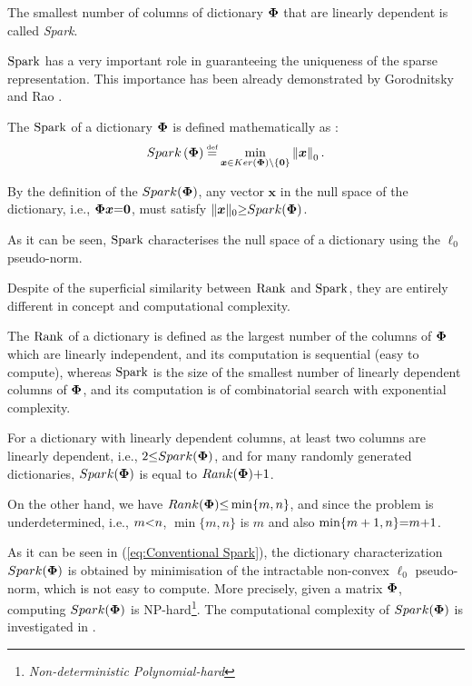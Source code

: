 The smallest number of columns of dictionary $\boldsymbol{\Phi}$ that are linearly dependent is called \emph{Spark}.

$\mathrm{Spark}$ has a very important role in guaranteeing the uniqueness of the sparse representation. 
This importance has been already demonstrated by Gorodnitsky and Rao \cite{Gorodnitsky1997}.

The $\mathrm{Spark}$ of a dictionary $\boldsymbol{\Phi}$ is defined mathematically as \cite{Gribonval2003a,Donoho2003,Donoho2003a,Bruckstein2009}:
\begin{equation}
\label{eq:Conventional Spark}
\mySpk\myparanthese{\myPhi} \myeq \min_{\boldsymbol{x} \in \myKerMath \backslash\left\{\boldsymbol{0}\right\}} \mynorm{\boldsymbol{x}}_{0}.
\end{equation}

By the definition of the $Spark(\boldsymbol{\Phi})$, any vector $\boldsymbol{x}$ in the null space of the dictionary, i.e., 
$\boldsymbol{\Phi} \boldsymbol{x}{=} \boldsymbol{0}$, must satisfy $\Vert\boldsymbol{x} \Vert_{0} {\geq} Spark(\boldsymbol{\Phi})$. 

As it can be seen, $\mathrm{Spark}$ characterises the null space of a dictionary using the $\ell_0$ pseudo-norm. 

Despite of the superficial similarity between $\mathrm{Rank}$ and $\mathrm{Spark}$, they are entirely different in concept and computational complexity. 

The $\mathrm{Rank}$ of a dictionary is defined as the largest number of the columns of $\boldsymbol{\Phi}$ which are linearly independent, and its computation is sequential (easy to compute), whereas $\mathrm{Spark}$ is the size of the smallest number of linearly dependent columns of $\boldsymbol{\Phi}$, and its computation is of combinatorial search with exponential complexity. 



For a dictionary with linearly dependent columns, at least two columns are linearly dependent, i.e., $2 {\leq} Spark(\boldsymbol{\Phi})$, and for many randomly generated dictionaries, $Spark(\boldsymbol{\Phi})$ is equal to $Rank(\boldsymbol{\Phi}) {+} 1$. 

On the other hand, we have $Rank(\boldsymbol{\Phi}) {\leq} \min\{m,n\}$, and since the problem is underdetermined, i.e., $m {<} n$, $\min\{m,n\}$ is $m$ and also $\min\{m+1,n\} {=} m {+} 1$.

As it can be seen in (\ref{eq:Conventional Spark}), the dictionary characterization $Spark(\boldsymbol{\Phi})$ is obtained by minimisation of the intractable non-convex $\ell_0$ pseudo-norm, which is not easy to compute.
More precisely, given a matrix $\boldsymbol{\Phi}$, computing $Spark(\boldsymbol{\Phi})$ is NP-hard\footnote{\emph{Non-deterministic Polynomial-hard}}.
The computational complexity of $Spark(\boldsymbol{\Phi})$ is investigated in \cite{Tillmann2013}.